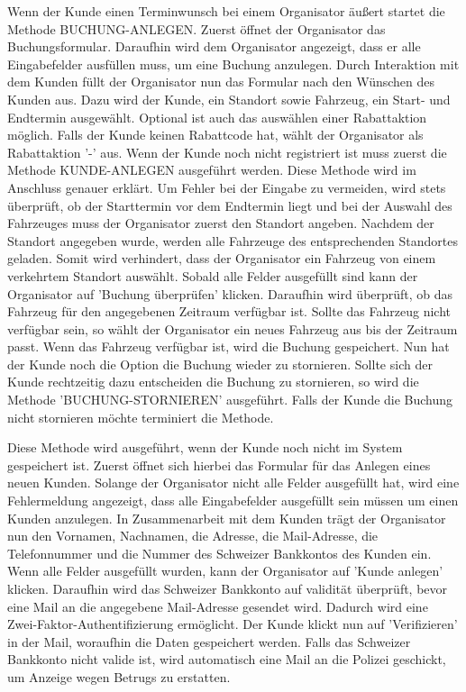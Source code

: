 
Wenn der Kunde einen Terminwunsch bei einem Organisator äußert startet die Methode BUCHUNG-ANLEGEN. Zuerst öffnet der Organisator das Buchungsformular. Daraufhin wird dem Organisator angezeigt, dass er alle Eingabefelder ausfüllen muss, um eine Buchung anzulegen. Durch Interaktion mit dem Kunden füllt der Organisator nun das Formular nach den Wünschen des Kunden aus. Dazu wird der Kunde, ein Standort sowie Fahrzeug, ein Start- und Endtermin ausgewählt. Optional ist auch das auswählen einer Rabattaktion möglich. Falls der Kunde keinen Rabattcode hat, wählt der Organisator als Rabattaktion '-' aus. Wenn der Kunde noch nicht registriert ist muss zuerst die Methode KUNDE-ANLEGEN ausgeführt werden. Diese Methode wird im Anschluss genauer erklärt. Um Fehler bei der Eingabe zu vermeiden, wird stets überprüft, ob der Starttermin vor dem Endtermin liegt und bei der Auswahl des Fahrzeuges muss der Organisator zuerst den Standort angeben. Nachdem der Standort angegeben wurde, werden alle Fahrzeuge des entsprechenden Standortes geladen. Somit wird verhindert, dass der Organisator ein Fahrzeug von einem verkehrtem Standort auswählt.
Sobald alle Felder ausgefüllt sind kann der Organisator auf 'Buchung überprüfen' klicken. Daraufhin wird überprüft, ob das Fahrzeug für den angegebenen Zeitraum verfügbar ist. Sollte das Fahrzeug nicht verfügbar sein, so wählt der Organisator ein neues Fahrzeug aus bis der Zeitraum passt. Wenn das Fahrzeug verfügbar ist, wird die Buchung gespeichert. Nun hat der Kunde noch die Option die Buchung wieder zu stornieren. Sollte sich der Kunde rechtzeitig dazu entscheiden die Buchung zu stornieren, so wird die Methode 'BUCHUNG-STORNIEREN' ausgeführt. Falls der Kunde die Buchung nicht stornieren möchte terminiert die Methode.

 \label{code:KundeAnlegen}
Diese Methode wird ausgeführt, wenn der Kunde noch nicht im System gespeichert ist. Zuerst öffnet sich hierbei das Formular für das Anlegen eines neuen Kunden. Solange der Organisator nicht alle Felder ausgefüllt hat, wird eine Fehlermeldung angezeigt, dass alle Eingabefelder ausgefüllt sein müssen um einen Kunden anzulegen. In Zusammenarbeit mit dem Kunden trägt der Organisator nun den Vornamen, Nachnamen, die Adresse, die Mail-Adresse, die Telefonnummer und die Nummer des Schweizer Bankkontos des Kunden ein. Wenn alle Felder ausgefüllt wurden, kann der Organisator auf 'Kunde anlegen' klicken. Daraufhin wird das Schweizer Bankkonto auf validität überprüft, bevor eine Mail an die angegebene Mail-Adresse gesendet wird. Dadurch wird eine Zwei-Faktor-Authentifizierung ermöglicht. Der Kunde klickt nun auf 'Verifizieren' in der Mail, woraufhin die Daten gespeichert werden. Falls das Schweizer Bankkonto nicht valide ist, wird automatisch eine Mail an die Polizei geschickt, um Anzeige wegen Betrugs zu erstatten. 

